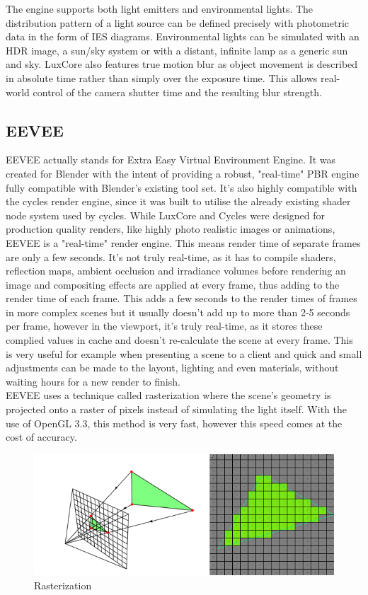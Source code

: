 \documentclass[conference]{IEEEtran}
\begin{document}
The engine supports both light emitters and environmental lights. The distribution pattern of a light source can be defined precisely with photometric data in the form of IES diagrams. Environmental lights can be simulated with an HDR image, a sun/sky system or with a distant, infinite lamp as a generic sun and sky. LuxCore also features true motion blur as object movement is described in absolute time rather than simply over the exposure time. This allows real-world control of the camera shutter time and the resulting blur strength.\cite{LuxWiki}

\subsection{EEVEE} \label{eevee_section}

EEVEE actually stands for Extra Easy Virtual Environment Engine. It was created for Blender with the intent of providing a robust, "real-time" PBR engine fully compatible with Blender's existing tool set. It's also highly compatible with the cycles render engine, since it was built to utilise the already existing shader node system used by cycles. While LuxCore and Cycles were designed for production quality renders, like highly photo realistic images or animations, EEVEE is a "real-time" render engine. This means render time of separate frames are only a few seconds. It's not truly real-time, as it has to compile shaders, reflection maps, ambient occlusion and irradiance volumes before rendering an image and compositing effects are applied at every frame, thus adding to the render time of each frame. This adds a few seconds to the render times of frames in more complex scenes but it usually doesn't add up to more than 2-5 seconds per frame, however in the viewport, it's truly real-time, as it stores these complied values in cache and doesn't re-calculate the scene at every frame. This is very useful for example when presenting a scene to a client and quick and small adjustments can be made to the layout, lighting and even materials, without waiting hours for a new render to finish.\\


EEVEE uses a technique called rasterization where the scene's geometry is projected onto a raster of pixels instead of simulating the light itself.\cite{EEVEEWorking} With the use of OpenGL 3.3, this method is very fast, however this speed comes at the cost of accuracy.

\begin{figure}[htbp]
\centerline{\includegraphics[scale=0.4]{Images/EeveeRasterize.png}}
\caption{Rasterization}
\label{eeveeRaster}
\end{figure}
\end{document}
